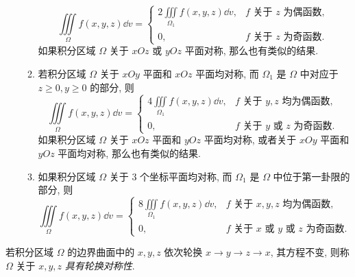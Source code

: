 \begin{theorem}[重积分的对称性]
\begin{enumerate}[label=(\arabic{*})]
\begin{enumerate}[label=(\roman{*})]
                        $$\iiint\limits_{\Omega} f(x, y, z) \dd  v=\begin{cases}
                                2 \displaystyle\iiint\limits_{\Omega_{1}} f(x, y, z) \dd  v, & f \text { 关于 } z \text { 为偶函数, } \\
                                0,                                                           & f \text { 关于 } z \text { 为奇函数. }
                            \end{cases}$$
                        如果积分区域 $ \Omega $ 关于 $ x O z $ 或 $ y O z $ 平面对称, 那么也有类似的结果.
                  \item 若积分区域 $ \Omega $ 关于 $ x O y $ 平面和 $ x O z $ 平面均对称, 而 $ \Omega_{1} $ 是 $ \Omega $ 中对应于 $ z \geqslant 0 ,  y \geqslant 0 $ 的部分, 则
                        $$\iiint\limits_{\Omega} f(x, y, z) \dd  v=\begin{cases}
                                4 \displaystyle\iiint\limits_{\Omega_{1}} f(x, y, z) \dd  v, & f \text { 关于 } y, z \text { 均为偶函数, }           \\
                                0,                                                           & f \text { 关于 } y \text { 或 } z \text { 为奇函数. }
                            \end{cases}$$
                        如果积分区域 $ \Omega $ 关于 $ x O z $ 平面和 $ y O z $ 平面均对称, 或者关于 $ x O y $ 平面和 $ y O z $ 平面均对称, 那么也有类似的结果.
                  \item 如果积分区域 $ \Omega $ 关于 $3$ 个坐标平面均对称, 而 $ \Omega_{1} $ 是 $ \Omega $ 中位于第一卦限的部分, 则
                        $$\iiint\limits_{\Omega} f(x, y, z) \dd  v=\begin{cases}
                                8 \displaystyle\iiint\limits_{\Omega_{1}} f(x, y, z) \dd  v, & f \text { 关于 } x, y, z \text { 均为偶函数, }                       \\
                                0,                                                           & f \text { 关于 } x \text { 或 } y \text { 或 } z \text { 为奇函数. }
                            \end{cases}$$
              \end{enumerate}
    \end{enumerate}
\end{theorem}

\begin{definition}[轮换对称性]
    若积分区域 $\Omega$ 的边界曲面中的 $x,y,z$ 依次轮换 $x\to y\to z\to x$, 其方程不变, 则称 $\Omega$ 关于 $x,y,z$ \textit{具有轮换对称性}.
\end{definition}

